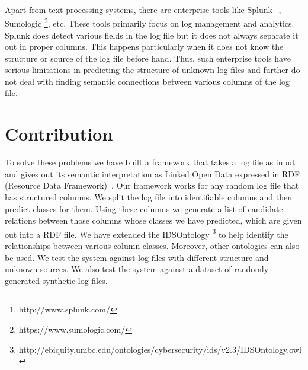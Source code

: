 Apart from text processing systems, there are enterprise tools like Splunk \footnote{http://www.splunk.com/}, Sumologic \footnote{https://www.sumologic.com/}, etc. These tools primarily focus on log management and analytics. Splunk does detect various fields in the log file but it does not always separate it out in proper columns. This happens particularly when it does not know the structure or source of the log file before hand. Thus, such enterprise tools have serious limitations in predicting the structure of unknown log files and further do not deal with finding semantic connections between various columns of the log file.


\section{Contribution}

To solve these problems we have built a framework that takes a log file as input and gives out its semantic interpretation as Linked Open Data expressed in RDF (Resource Data Framework)~\cite{brickley2004rdf}. Our framework works for any random log file that has structured columns. We split the log file into identifiable columns and then predict classes for them. Using these columns we generate a list of candidate relations between those columns whose classes we have predicted, which are given out into a RDF file. We have extended the IDSOntology \footnote{http://ebiquity.umbc.edu/ontologies/cybersecurity/ids/v2.3/IDSOntology.owl} to help identify the relationships between various column classes. Moreover, other ontologies can also be used. We test the system against log files with different structure and unknown sources. We also test the system against a dataset of randomly generated synthetic log files.
